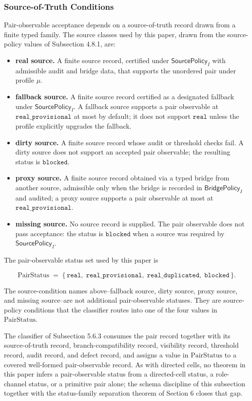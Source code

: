 \documentclass[11pt]{article}
\providecommand{\tightlist}{}
\theoremstyle{definition}
\begin{document}
\subsubsection{Source-of-Truth Conditions}

Pair-observable acceptance depends on a source-of-truth record drawn from a finite typed family. The source classes used by this paper, drawn from the source-policy values of Subsection 4.8.1, are:

\begin{itemize}
\tightlist
\item
  \textbf{real source.} A finite source record, certified under \(\mathsf{SourcePolicy}_I\) with admissible audit and bridge data, that supports the unordered pair under profile \(\mu\).
\item
  \textbf{fallback source.} A finite source record certified as a designated fallback under \(\mathsf{SourcePolicy}_I\). A fallback source supports a pair observable at \(\texttt{real\_provisional}\) at most by default; it does not support \(\texttt{real}\) unless the profile explicitly upgrades the fallback.
\item
  \textbf{dirty source.} A finite source record whose audit or threshold checks fail. A dirty source does not support an accepted pair observable; the resulting status is \(\texttt{blocked}\).
\item
  \textbf{proxy source.} A finite source record obtained via a typed bridge from another source, admissible only when the bridge is recorded in \(\mathsf{BridgePolicy}_I\) and audited; a proxy source supports a pair observable at most at \(\texttt{real\_provisional}\).
\item
  \textbf{missing source.} No source record is supplied. The pair observable does not pass acceptance: the status is \(\texttt{blocked}\) when a source was required by \(\mathsf{SourcePolicy}_I\).
\end{itemize}

The pair-observable status set used by this paper is

\[
\mathrm{PairStatus}\;=\;\{\,\texttt{real},\;\texttt{real\_provisional},\;\texttt{real\_duplicated},\;\texttt{blocked}\,\}.
\]

The source-condition names above--fallback source, dirty source, proxy source, and missing source--are not additional pair-observable statuses. They are source-policy conditions that the classifier routes into one of the four values in \(\mathrm{PairStatus}\).

The classifier of Subsection 5.6.3 consumes the pair record together with its source-of-truth record, branch-compatibility record, visibility record, threshold record, audit record, and defect record, and assigns a value in \(\mathrm{PairStatus}\) to a covered well-formed pair-observable record. As with directed cells, no theorem in this paper infers a pair-observable status from a directed-cell status, a role-channel status, or a primitive pair alone; the schema discipline of this subsection together with the status-family separation theorem of Section 6 closes that gap.
\end{document}
